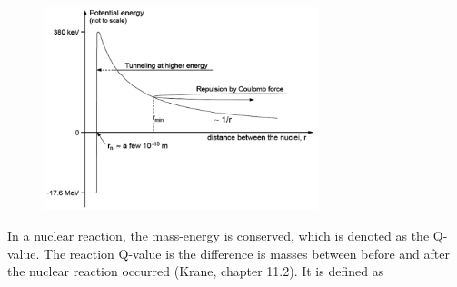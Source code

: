 


\begin{figure}
    \centering
    \includegraphics[width=8cm]{Theory/Coulomb_barr.png}
    \caption{ }
    \label{fig:Coulomb_barrier}
\end{figure}

\noindent In a nuclear reaction, the mass-energy is conserved, which is denoted as the Q-value. The reaction Q-value is the difference is masses between before and after the nuclear reaction occurred (Krane, chapter 11.2). It is defined as 

